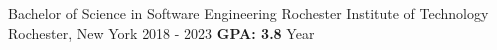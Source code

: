 \documentclass{awesome-cv}
\begin{document}
	\makecvheader[C]

	\makecvfooter
		{}
		{}
		{}

				

		\vspace{-0.1cm}
		\begin{cventries}
			\cventry
				{Bachelor of Science in Software Engineering}
				{Rochester Institute of Technology}
				{Rochester, New York}
				{2018 - 2023}
                {\textbf{GPA: 3.8}  Year}
		\end{cventries}
		
		\vspace{-0.2cm}

			\vspace{-0.15cm}
\end{document}

